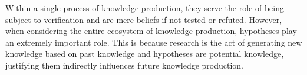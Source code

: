 \documentclass{book}
\begin{document}
Within a single process of knowledge production, they serve the role of being subject to verification and are mere beliefs if not tested or refuted. However, when considering the entire ecosystem of knowledge production, hypotheses play an extremely important role. This is because research is the act of generating new knowledge based on past knowledge and hypotheses are potential knowledge, justifying them indirectly influences future knowledge production.




\end{document}
